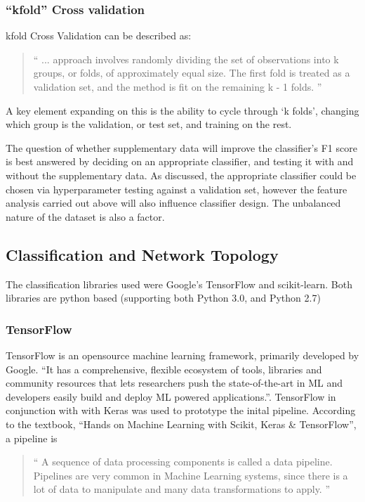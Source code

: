 \documentclass{UoNMCHA}
\newcommand{\inlineQuote}[1]{``#1''}
\newcommand{\fancyquote}[1]{\begin{quotation}\inlineQuote{#1}\end{quotation}}
\numberwithin{equation}{section}
\begin{document}
\subsubsection{\inlineQuote{kfold} Cross validation}
kfold Cross Validation can be described as:
\fancyquote{
    ... approach involves randomly dividing the set of observations into k groups, or folds, of approximately equal size. The first fold is treated as a validation set, and the method is fit on the remaining k - 1 folds. 
    }\cite{James2017}
A key element expanding on this is the ability to cycle through `k folds', changing which group is the validation, or test set, and training on the rest.

The question of whether supplementary data will improve the classifier's F1 score is best answered by deciding on an appropriate classifier, and testing it with and without the supplementary data. As discussed, the appropriate classifier could be chosen via hyperparameter testing against a validation set, however the feature analysis carried out above will also influence classifier design. The unbalanced nature of the dataset is also a factor.


\subsection{Classification and Network Topology}
The classification libraries used were Google's TensorFlow and scikit-learn. Both libraries are python based (supporting both Python 3.0, and Python 2.7) \cite{scikitlearnpythonVer} \cite{TFpythonVer}%

\subsubsection{TensorFlow}
TensorFlow is an opensource machine learning framework, primarily developed by Google.
\inlineQuote{It has a comprehensive, flexible ecosystem of tools, libraries and community resources that lets researchers push the state-of-the-art in ML and developers easily build and deploy ML powered applications.}\cite{TFwebsite}. TensorFlow in conjunction with with Keras was used to prototype the inital pipeline. According to the textbook, \inlineQuote{Hands on Machine Learning with Scikit, Keras \& TensorFlow}, a pipeline is 
\fancyquote{
A sequence of data processing components is called a data pipeline. Pipelines are very common in Machine Learning systems, since there is a lot of data to manipulate and many data transformations to apply\cite{HandsOnMLTextbook}.
}
\end{document}
